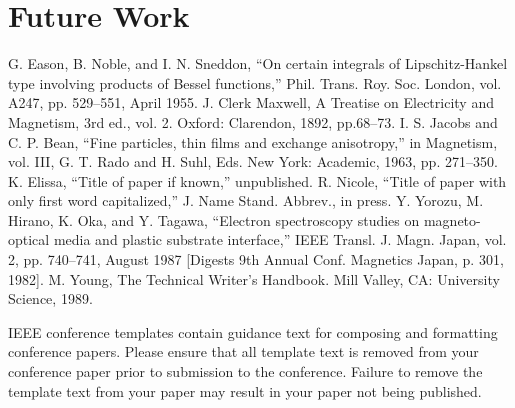 \documentclass[11pt,conference]{IEEEtran}
\begin{document}
\section{Future Work}


\begin{thebibliography}{00}
	 G. Eason, B. Noble, and I. N. Sneddon, ``On certain integrals of Lipschitz-Hankel type involving products of Bessel functions,'' Phil. Trans. Roy. Soc. London, vol. A247, pp. 529--551, April 1955.
	 J. Clerk Maxwell, A Treatise on Electricity and Magnetism, 3rd ed., vol. 2. Oxford: Clarendon, 1892, pp.68--73.
	 I. S. Jacobs and C. P. Bean, ``Fine particles, thin films and exchange anisotropy,'' in Magnetism, vol. III, G. T. Rado and H. Suhl, Eds. New York: Academic, 1963, pp. 271--350.
	 K. Elissa, ``Title of paper if known,'' unpublished.
	 R. Nicole, ``Title of paper with only first word capitalized,'' J. Name Stand. Abbrev., in press.
	 Y. Yorozu, M. Hirano, K. Oka, and Y. Tagawa, ``Electron spectroscopy studies on magneto-optical media and plastic substrate interface,'' IEEE Transl. J. Magn. Japan, vol. 2, pp. 740--741, August 1987 [Digests 9th Annual Conf. Magnetics Japan, p. 301, 1982].
	 M. Young, The Technical Writer's Handbook. Mill Valley, CA: University Science, 1989.
\end{thebibliography}
\vspace{12pt}
\color{red}
IEEE conference templates contain guidance text for composing and formatting conference papers. Please ensure that all template text is removed from your conference paper prior to submission to the conference. Failure to remove the template text from your paper may result in your paper not being published.
\end{document}
